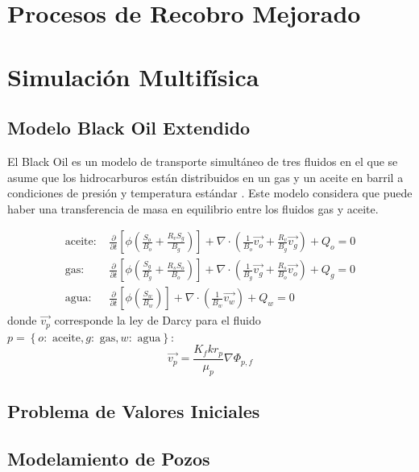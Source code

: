 \section{Procesos de Recobro Mejorado}

\section{Simulación Multifísica}
\subsection{Modelo Black Oil Extendido}

El Black Oil es un modelo de transporte simultáneo de tres fluidos en el que se asume que los hidrocarburos están distribuidos en un gas y un aceite en barril a condiciones de presión y temperatura estándar \citep{chen2007reservoir}. Este modelo considera que puede haber una transferencia de masa en equilibrio entre los fluidos gas y aceite. 

\begin{align}
\label{ec:aceite}
\text{aceite: }&\frac{\partial}{\partial t} \left[ \phi \left( \frac{S_{o}}{B_{o}} + \frac{R_{v} S_{g}}{B_{g}} \right) \right]
+ \nabla \cdot \left( \frac{1}{B_{o}} \vec{v_{o}} + \frac{R_{v}}{B_{g}} \vec{v_{g}} \right) + Q_{o} = 0 \\
\label{ec:gas}
\text{gas: }&\frac{\partial}{\partial t} \left[ \phi \left( \frac{S_{g}}{B_{g}} + \frac{R_{s} S_{o}}{B_{o}} \right) \right]
+ \nabla \cdot \left( \frac{1}{B_{g}} \vec{v_{g}} + \frac{R_{s}}{B_{o}} \vec{v_{o}} \right) + Q_{g} = 0\\
\label{ec:agua}
\text{agua: }&\frac{\partial}{\partial t} \left[\phi \left( \frac{S_{w}}{B_{w}} \right) \right] + \nabla \cdot \left( \frac{1}{B_{w}} \vec{v_{w}} \right) + Q_{w} = 0
\end{align}
donde $\vec{v_{p}}$ corresponde la ley de Darcy para el fluido $p = \left\lbrace o:\text{ aceite}, g:\text{ gas}, w:\text{ agua} \right\rbrace $:
\begin{equation}
\vec{v_{p}}=\frac{K_{f}kr_{p}}{\mu_{p} } \nabla{\Phi_{p,f}}
\end{equation}
\subsection{Problema de Valores Iniciales}
%
\subsection{Modelamiento de Pozos}
%
